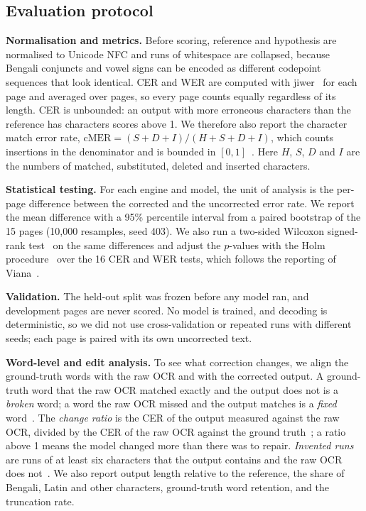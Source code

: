 \documentclass[conference]{IEEEtran}
\begin{document}
\subsection{Evaluation protocol}
\textbf{Normalisation and metrics.} Before scoring, reference and hypothesis are normalised to Unicode NFC and runs of whitespace are collapsed, because Bengali conjuncts and vowel signs can be encoded as different codepoint sequences that look identical. CER and WER are computed with jiwer~\cite{vaessen2022jiwer} for each page and averaged over pages, so every page counts equally regardless of its length. CER is unbounded: an output with more erroneous characters than the reference has characters scores above 1. We therefore also report the character match error rate, $\mathrm{cMER}=(S+D+I)/(H+S+D+I)$, which counts insertions in the denominator and is bounded in $[0,1]$~\cite{ehrmann2026hipeocrepair}. Here $H$, $S$, $D$ and $I$ are the numbers of matched, substituted, deleted and inserted characters.

\textbf{Statistical testing.} For each engine and model, the unit of analysis is the per-page difference between the corrected and the uncorrected error rate. We report the mean difference with a 95\% percentile interval from a paired bootstrap of the 15 pages (10{,}000 resamples, seed 403). We also run a two-sided Wilcoxon signed-rank test~\cite{wilcoxon1945} on the same differences and adjust the $p$-values with the Holm procedure~\cite{holm1979} over the 16 CER and WER tests, which follows the reporting of Viana~\cite{viana2026reframing}.

\textbf{Validation.} The held-out split was frozen before any model ran, and development pages are never scored. No model is trained, and decoding is deterministic, so we did not use cross-validation or repeated runs with different seeds; each page is paired with its own uncorrected text.

\textbf{Word-level and edit analysis.} To see what correction changes, we align the ground-truth words with the raw OCR and with the corrected output. A ground-truth word that the raw OCR matched exactly and the output does not is a \emph{broken} word; a word the raw OCR missed and the output matches is a \emph{fixed} word~\cite{kumar2026postasr}. The \emph{change ratio} is the CER of the output measured against the raw OCR, divided by the CER of the raw OCR against the ground truth~\cite{koynov2025opportunities}; a ratio above 1 means the model changed more than there was to repair. \emph{Invented runs} are runs of at least six characters that the output contains and the raw OCR does not~\cite{koynov2025opportunities}. We also report output length relative to the reference, the share of Bengali, Latin and other characters, ground-truth word retention, and the truncation rate.
\end{document}
